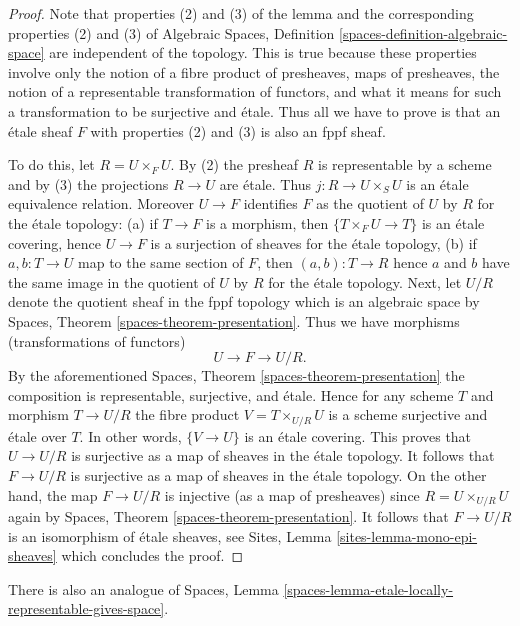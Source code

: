 \begin{proof}
Note that properties (2) and (3) of the lemma and the corresponding
properties (2) and (3) of
Algebraic Spaces, Definition \ref{spaces-definition-algebraic-space}
are independent of the topology. This is true because these properties
involve only the notion of a fibre product of presheaves, maps of
presheaves, the notion of a representable transformation of functors,
and what it means for such a transformation to be surjective and \'etale.
Thus all we have to prove is that an \'etale sheaf $F$ with properties
(2) and (3) is also an fppf sheaf.

\medskip\noindent
To do this, let $R = U \times_F U$. By (2) the presheaf $R$ is representable
by a scheme and by (3) the projections $R \to U$ are \'etale. Thus
$j : R \to U \times_S U$ is an \'etale equivalence relation. Moreover
$U \to F$ identifies $F$ as the quotient of $U$ by $R$ for the
\'etale topology: (a) if $T \to F$ is a morphism, then $\{T \times_F U \to T\}$
is an \'etale covering, hence $U \to F$ is a surjection of sheaves for the
\'etale topology, (b) if $a, b : T \to U$ map to the same section of $F$,
then $(a, b) : T \to R$ hence $a$ and $b$ have the same image in the quotient
of $U$ by $R$ for the \'etale topology. Next, let $U/R$ denote the quotient
sheaf in the fppf topology which is an algebraic space by
Spaces, Theorem \ref{spaces-theorem-presentation}.
Thus we have morphisms (transformations of functors)
$$
U \to F \to U/R.
$$
By the aforementioned
Spaces, Theorem \ref{spaces-theorem-presentation}
the composition is representable, surjective, and \'etale. Hence for any
scheme $T$ and morphism $T \to U/R$ the fibre product $V = T \times_{U/R} U$
is a scheme surjective and \'etale over $T$. In other words, $\{V \to U\}$
is an \'etale covering. This proves that $U \to U/R$ is surjective as
a map of sheaves in the \'etale topology. It follows that
$F \to U/R$ is surjective as a map of sheaves in the \'etale topology.
On the other hand, the map $F \to U/R$ is injective (as a map of presheaves)
since $R = U \times_{U/R} U$ again by
Spaces, Theorem \ref{spaces-theorem-presentation}.
It follows that $F \to U/R$ is an isomorphism of \'etale sheaves, see
Sites, Lemma \ref{sites-lemma-mono-epi-sheaves}
which concludes the proof.
\end{proof}

There is also an analogue of
Spaces, Lemma \ref{spaces-lemma-etale-locally-representable-gives-space}.


